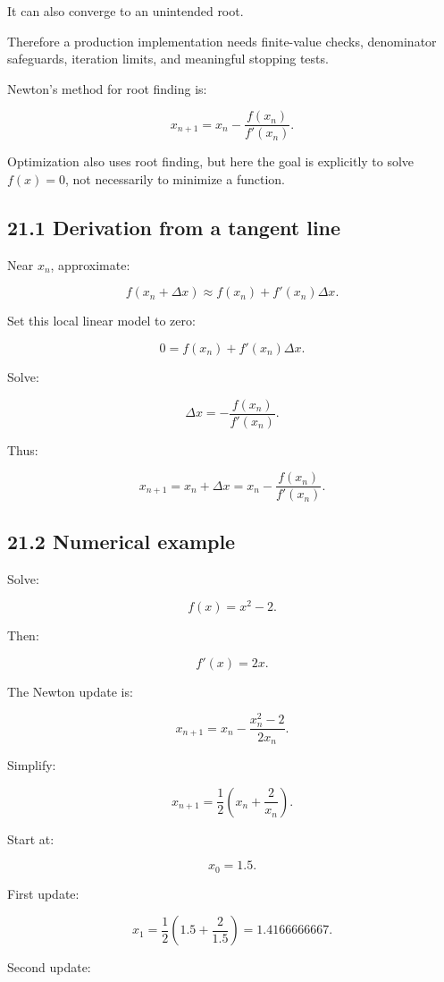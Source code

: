 It can also converge to an unintended root.

Therefore a production implementation needs finite-value checks, denominator safeguards, iteration limits, and meaningful stopping tests.

Newton's method for root finding is:

\[ \boxed{ x_{n+1} = x_n-\frac{f(x_n)}{f'(x_n)} }. \]

Optimization also uses root finding, but here the goal is explicitly to solve \(f(x)=0\), not necessarily to minimize a function.

\subsection{21.1 Derivation from a tangent line}\label{02-foundations-ii-ch028-derivation-from-a-tangent-line}

Near \(x_n\), approximate:

\[ f(x_n+\Delta x) \approx f(x_n)+f'(x_n)\Delta x. \]

Set this local linear model to zero:

\[ 0=f(x_n)+f'(x_n)\Delta x. \]

Solve:

\[ \Delta x=-\frac{f(x_n)}{f'(x_n)}. \]

Thus:

\[ x_{n+1}=x_n+\Delta x = x_n-\frac{f(x_n)}{f'(x_n)}. \]

\subsection{21.2 Numerical example}\label{02-foundations-ii-ch028-numerical-example-3}

Solve:

\[ f(x)=x^2-2. \]

Then:

\[ f'(x)=2x. \]

The Newton update is:

\[ x_{n+1} = x_n-\frac{x_n^2-2}{2x_n}. \]

Simplify:

\[ \boxed{ x_{n+1}= \frac12\left(x_n+\frac2{x_n}\right) }. \]

Start at:

\[ x_0=1.5. \]

First update:

\[ x_1= \frac12\left(1.5+\frac2{1.5}\right) = \boxed{1.4166666667}. \]

Second update:

